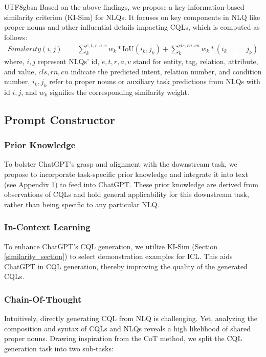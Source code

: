 \documentclass[runningheads]{llncs}
\begin{document}
\begin{CJK*}{UTF8}{gbsn}
Based on the above findings, we propose a key-information-based similarity criterion (KI-Sim) for NLQs. It focuses on key components in NLQ like proper nouns and other influential details impacting CQLs, which is computed as follows: 
\begin{align}
    \label{similarity_equation}
    Similarity(i, j) &= \sum_k^{e, t, r, a, v} w_k * \text{IoU}(i_k, j_k) + \sum_k^{cls, rn, cn} w_k * (i_k == j_k)
\end{align}
where, $i, j$ represent NLQs' id, 
$e, t, r, a, v$ stand for entity, tag, relation, attribute, and value, 
$cls, rn, cn$ indicate the predicted intent, relation number, and condition number, 
$i_k, j_k$ refer to proper nouns or auxiliary task predictions from NLQs with id $i, j$, 
and $w_k$ signifies the corresponding similarity weight.


\subsection{Prompt Constructor}

\subsubsection{Prior Knowledge}

To bolster ChatGPT's grasp and alignment with the downstream task, we propose to incorporate task-specific prior knowledge and integrate it into text (see Appendix 1) to feed into ChatGPT. 
These prior knowledge are derived from observations of CQLs and hold general applicability for this downstream task, rather than being specific to any particular NLQ.

\subsubsection{In-Context Learning}

To enhance ChatGPT's CQL generation, we utilize KI-Sim (Section \ref{similarity_section}) to select demonstration examples for ICL. This aids ChatGPT in CQL generation, thereby improving the quality of the generated CQLs.

\subsubsection{Chain-Of-Thought}

Intuitively, directly generating CQL from NLQ is challenging. Yet, analyzing the composition and syntax of CQLs and NLQs reveals a high likelihood of shared proper nouns. Drawing inspiration from the CoT method, we split the CQL generation task into two sub-tasks:


\end{CJK*}
\end{document}
